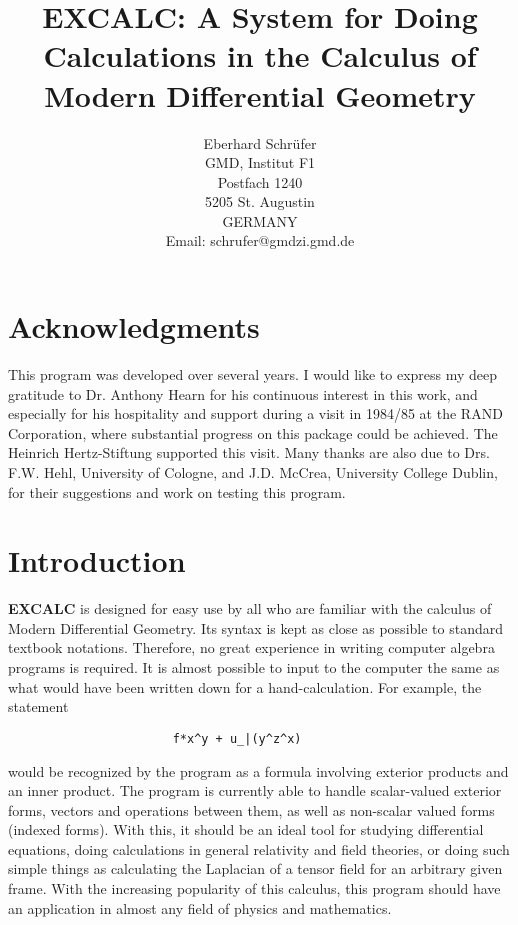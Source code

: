\title{EXCALC: A System for Doing Calculations in the Calculus of Modern
Differential Geometry}
\author{Eberhard Schr\"{u}fer \\
GMD, Institut F1   \\
Postfach 1240      \\
5205 St. Augustin  \\
GERMANY       \\[0.05in]
Email: schrufer@gmdzi.gmd.de}

\maketitle


\section*{Acknowledgments}

This program was developed over several years. I would like to express
my deep gratitude to Dr. Anthony Hearn for his continuous interest in
this work, and especially for his hospitality and support during a
visit in 1984/85 at the RAND Corporation, where substantial progress
on this package could be achieved. The Heinrich Hertz-Stiftung
supported this visit. Many thanks are also due to Drs. F.W. Hehl,
University of Cologne, and J.D. McCrea, University College Dublin, for
their suggestions and work on testing this program.

\section{Introduction}

{\bf EXCALC} is designed for easy use by all who are familiar with the
calculus of Modern Differential Geometry.  Its syntax is kept as close
as possible to standard textbook notations.  Therefore, no great
experience in writing computer algebra programs is required.  It is
almost possible to input to the computer the same as what would have
been written down for a hand-calculation.  For example, the statement

\begin{verbatim}
                       f*x^y + u_|(y^z^x)
\end{verbatim}

would be recognized by the program as a formula involving exterior
products and an inner product.  The program is currently able to
handle scalar-valued exterior forms, vectors and operations between
them, as well as non-scalar valued forms (indexed forms).  With this,
it should be an ideal tool for studying differential equations,
doing calculations in general relativity and field theories, or doing
such simple things as calculating the Laplacian of a tensor field for
an arbitrary given frame.  With the increasing popularity of this
calculus, this program should have an application in almost any field
of physics and mathematics.

